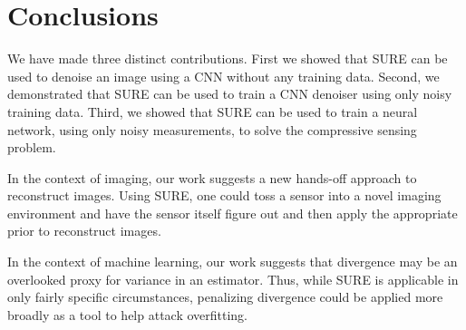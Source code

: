 \documentclass{article}
\begin{document}
\section{Conclusions}

We have made three distinct contributions. 
First we showed that SURE can be used to denoise an image using a CNN without any training data. 
Second, we demonstrated that SURE can be used to train a CNN denoiser using only noisy training data. 
Third, we showed that SURE can be used to train a neural network, using only noisy measurements, to solve the compressive sensing problem. 

In the context of imaging, our work suggests a new hands-off approach to reconstruct images. Using SURE, one could toss a sensor into a novel imaging environment and have the sensor itself figure out and then apply the appropriate prior to reconstruct images.

In the context of machine learning, our work suggests that divergence may be an overlooked proxy for variance in an estimator. Thus, while SURE is applicable in only fairly specific circumstances, penalizing divergence could be applied more broadly as a tool to help attack overfitting.










{\small
	
	
}
\end{document}
